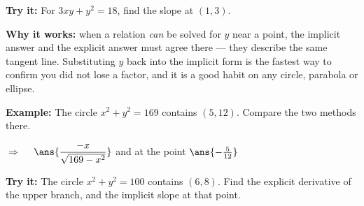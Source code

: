 \documentclass[12pt]{article}
\begin{document}
\begin{tryitbox}
\textbf{Try it:} \quad For $3xy + y^2 = 18$, find the slope at $(1,3)$.\\[2pt]
\end{tryitbox}


\begin{formulabox}
\textbf{Why it works:} when a relation \emph{can} be solved for $y$ near a
point, the implicit answer and the explicit answer must agree there --- they
describe the same tangent line. Substituting $y$ back into the implicit form is
the fastest way to confirm you did not lose a factor, and it is a good habit on
any circle, parabola or ellipse.
\end{formulabox}

\begin{examplebox}
\textbf{Example:} \quad The circle $x^2 + y^2 = 169$ contains $(5,12)$. Compare
the two methods there.

$\Rightarrow\quad$ $\ans{\dfrac{-x}{\sqrt{169-x^2}}}$ \quad and at the point \quad $\ans{-\tfrac{5}{12}}$
\end{examplebox}

\begin{tryitbox}
\textbf{Try it:} \quad The circle $x^2+y^2=100$ contains $(6,8)$. Find the
explicit derivative of the upper branch, and the implicit slope at that point.\\[2pt]
\end{tryitbox}
\end{document}
